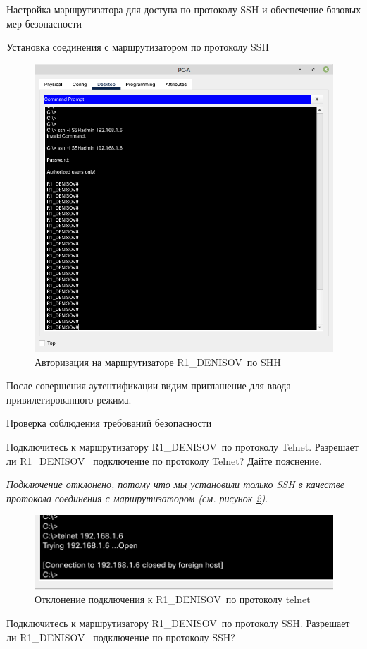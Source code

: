 \documentclass[a4paper,14pt]{extarticle}
\newcommand{\router}{R1\_DENISOV~}
\begin{document}
\begin{mypart}{Настройка маршрутизатора для доступа по протоколу SSH и
		обеспечение базовых мер безопасности}
\begin{step}{Установка соединения с маршрутизатором по протоколу SSH}
	\begin{figure}[h!]
		\centering
		\includegraphics[width=0.6\linewidth]{images/pr8-ssh-to-router}
		\caption{Авторизация на маршрутизаторе \router по SHH}
		\label{fig:pr8-ssh-to-router}
	\end{figure}
	
	После совершения аутентификации видим приглашение для ввода привилегированного режима.
\end{step}


\begin{step}{Проверка соблюдения требований безопасности}


\q Подключитесь к маршрутизатору \router по протоколу Telnet. Разрешает ли \router
подключение по протоколу Telnet? Дайте пояснение.

\ans \textit{Подключение отклонено, потому что мы установили только SSH в качестве протокола соединения с маршрутизатором (см. рисунок \ref{fig:pr-8-telnet-abort})}. 

\begin{figure}
	\centering
	\includegraphics[width=0.6\linewidth]{images/pr-8-telnet-abort}
	\caption{Отклонение подключения к \router по протоколу telnet}
	\label{fig:pr-8-telnet-abort}
\end{figure}



\q Подключитесь к маршрутизатору \router по протоколу SSH. Разрешает ли \router
подключение по протоколу SSH?


\end{step}
\end{mypart}
\end{document}

